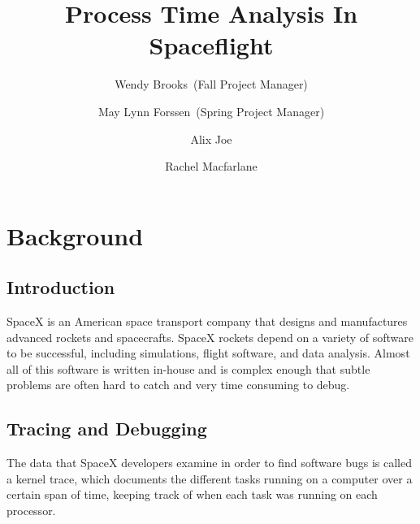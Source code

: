 \documentclass{hmcclinic}
\title{Process Time Analysis In Spaceflight}
\author{Wendy Brooks~(Fall Project Manager) \and May Lynn Forssen~(Spring Project Manager) \and Alix Joe \and
Rachel Macfarlane}
\begin{document}

\maketitle
 
\tableofcontents



\chapter{Background} %
\section{Introduction}
SpaceX is an American space transport company that designs and manufactures
advanced rockets and spacecrafts. SpaceX rockets depend on a variety of software
to be successful, including simulations, flight software, and data analysis.
Almost all of this software is written in-house and is complex enough that subtle
problems are often hard to catch and very time consuming to debug.

\section{Tracing and Debugging}
The data that SpaceX developers examine in order to find software bugs is called
a kernel trace, which documents the different tasks running on a computer over a
certain span of time, keeping track of when each task was running on each processor. 
\end{document}
